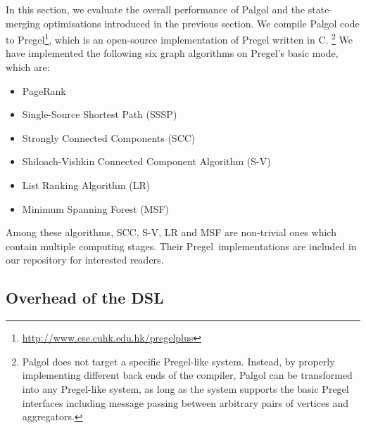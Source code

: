 \documentclass{sokendai_thesis} %
\newcommand{\plus}{\raisebox{.25ex}{\scalebox{.8}{+}}}
\newcommand{\plusplus}{\plus\plus}
\begin{document}
In this section, we evaluate the overall performance of Palgol and the state-merging optimisations introduced in the previous section.
We compile Palgol code to Pregel\plus\footnote{\url{http://www.cse.cuhk.edu.hk/pregelplus}}, which is an open-source implementation of Pregel written in C\plusplus.%
\footnote{Palgol does not target a specific Pregel-like system.
Instead, by properly implementing different back ends of the compiler, Palgol can be transformed into any Pregel-like system, as long as the system supports the basic Pregel interfaces including message passing between arbitrary pairs of vertices and aggregators.}
We have implemented the following six graph algorithms on Pregel\plus's basic mode, which are:
\begin{itemize} 
 \item PageRank~\cite{pregel}
 \item Single-Source Shortest Path (SSSP)~\cite{pregel}
 \item Strongly Connected Components (SCC)~\cite{yan2015effective}
 \item Shiloach-Vishkin Connected Component Algorithm (S-V)~\cite{yan2015effective}
 \item List Ranking Algorithm (LR)~\cite{yan2015effective}
 \item Minimum Spanning Forest (MSF)~\cite{boruvka}
\end{itemize}
Among these algorithms, SCC, S-V, LR and MSF are non-trivial ones which contain multiple computing stages.
Their Pregel\plus\ implementations are included in our repository for interested readers.

\subsection{Overhead of the DSL}
\end{document}
